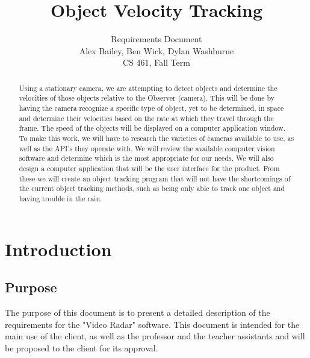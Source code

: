 \documentclass[letterpaper,10pt,onecolumn,draftclsnofoot]{IEEEtran}
\title{Object Velocity Tracking}
\author{Requirements Document\\Alex Bailey, Ben Wick, Dylan Washburne\\CS 461, Fall Term}
\begin{document}
\begin{titlepage}

\maketitle

\begin{abstract}
Using a stationary camera, we are attempting to detect objects and determine the velocities of those objects relative to the Observer (camera).
This will be done by having the camera recognize a specific type of object, yet to be determined, in space and determine their velocities based on the rate at which they travel through the frame.
The speed of the objects will be displayed on a computer application window.
To make this work, we will have to research the varieties of cameras available to use, as well as the API’s they operate with.
We will review the available computer vision software and determine which is the most appropriate for our needs.
We will also design a computer application that will be the user interface for the product.
From these we will create an object tracking program that will not have the shortcomings of the current object tracking methods, such as being only able to track one object and having trouble in the rain.

 
\end{abstract}

\end{titlepage}


\section{Introduction}
\subsection{Purpose}
The purpose of this document is to present a detailed description of the requirements for the "Video Radar" software.
This document is intended for the main use of the client, as well as the professor and the teacher assistants and will be proposed to the client for its approval.
\end{document}
